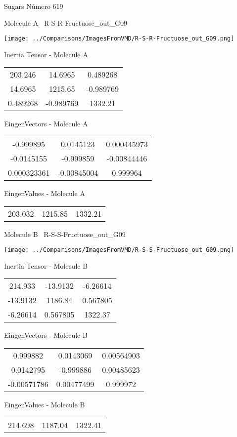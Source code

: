\vtab[-3cm]
\begin{center}
{\large Sugars \tab Número 619}
\end{center}
\begin{multicols}{2}
\begin{center}

Molecule A \
R-S-R-Fructuose\_out\_G09

\texttt{[image: ../Comparisons/ImagesFromVMD/R-S-R-Fructuose\_out\_G09.png]}

Inertia Tensor - Molecule A \\
\begin{tabular}{|c c c|}
203.246	 & 	14.6965	 & 	0.489268	 \\
14.6965	 & 	1215.65	 & 	-0.989769	 \\
0.489268	 & 	-0.989769	 & 	1332.21
\end{tabular}

\vtab
 EingenVectors - Molecule A     \\
\begin{tabular}{|c c c|}
-0.999895	 & 	0.0145123	 & 	0.000445973	 \\
-0.0145155	 & 	-0.999859	 & 	-0.00844446	 \\
0.000323361	 & 	-0.00845004	 & 	0.999964
\end{tabular}

\vtab
 EingenValues - Molecule A     \\
\begin{tabular}{|c c c|}
203.032	 & 	1215.85	 & 	1332.21	 \\
\end{tabular}
\columnbreak

Molecule B \
R-S-S-Fructuose\_out\_G09

\texttt{[image: ../Comparisons/ImagesFromVMD/R-S-S-Fructuose\_out\_G09.png]}

Inertia Tensor - Molecule B \\
\begin{tabular}{|c c c|}
214.933	 & 	-13.9132	 & 	-6.26614	 \\
-13.9132	 & 	1186.84	 & 	0.567805	 \\
-6.26614	 & 	0.567805	 & 	1322.37
\end{tabular}

\vtab
 EingenVectors - Molecule B     \\
\begin{tabular}{|c c c|}
0.999882	 & 	0.0143069	 & 	0.00564903	 \\
0.0142795	 & 	-0.999886	 & 	0.00485623	 \\
-0.00571786	 & 	0.00477499	 & 	0.999972
\end{tabular}

\vtab
 EingenValues - Molecule B     \\
\begin{tabular}{|c c c|}
214.698	 & 	1187.04	 & 	1322.41	 \\
\end{tabular}

\end{center}
\end{multicols}

